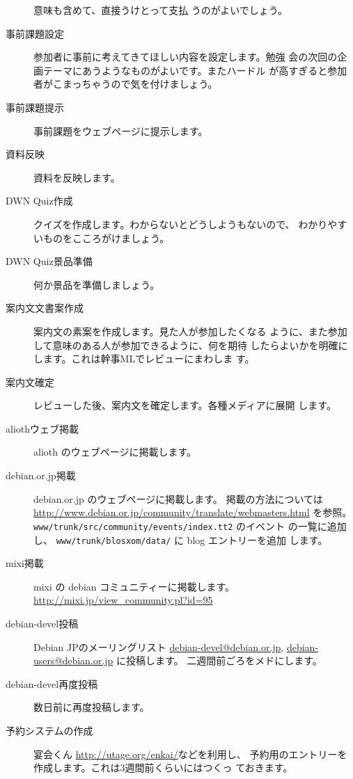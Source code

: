 \documentclass[mingoth,a4paper]{jsarticle}
\begin{document}
\begin{description}
	   意味も含めて、直接うけとって支払
	   うのがよいでしょう。
\item[事前課題設定] 参加者に事前に考えてきてほしい内容を設定します。勉強
	   会の次回の企画テーマにあうようなものがよいです。またハードル
	   が高すぎると参加者がこまっちゃうので気を付けましょう。
\item[事前課題提示] 事前課題をウェブページに提示します。
\item[資料反映] 資料を反映します。
\item[DWN Quiz作成] クイズを作成します。わからないとどうしようもないので、
	   わかりやすいものをこころがけましょう。
\item[DWN Quiz景品準備] 何か景品を準備しましょう。
\item[案内文文書案作成] 案内文の素案を作成します。見た人が参加したくなる
	   ように、また参加して意味のある人が参加できるように、何を期待
	   したらよいかを明確にします。これは幹事MLでレビューにまわしま
	   す。
\item[案内文確定] レビューした後、案内文を確定します。各種メディアに展開
	   します。
\item[aliothウェブ掲載] alioth のウェブページに掲載します。
\item[debian.or.jp掲載] debian.or.jp のウェブページに掲載します。
	   掲載の方法については
	   \url{http://www.debian.or.jp/community/translate/webmasters.html}
	   を参照。
	   \texttt{www/trunk/src/community/events/index.tt2} のイベント
	   の一覧に追加し、 \texttt{www/trunk/blosxom/data/} に blog エントリーを追加
	   します。
\item[mixi掲載]  mixi の debian コミュニティーに掲載します。\url{http://mixi.jp/view_community.pl?id=95}
\item[debian-devel投稿]
	   Debian JPのメーリングリスト \url{debian-devel@debian.or.jp},
	   \url{debian-users@debian.or.jp} に投稿します。
	   二週間前ごろをメドにします。
\item[debian-devel再度投稿]
	   数日前に再度投稿します。
\item[予約システムの作成]
	   宴会くん \url{http://utage.org/enkai/}などを利用し、
	   予約用のエントリーを作成します。これは3週間前くらいにはつくっ
	   ておきます。
	   

\end{description}
\end{document}
